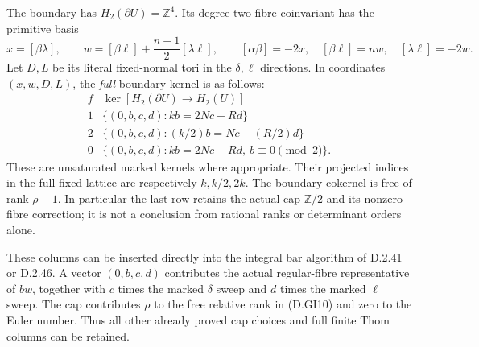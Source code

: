 The boundary has $H_2(\partial U)=\mathbb Z^4$. Its
degree-two fibre coinvariant has the primitive basis
\[
 x=[\beta\lambda],\qquad
 w=[\beta\ell]+\frac{n-1}{2}[\lambda\ell],\qquad
 [\alpha\beta]=-2x,\quad [\beta\ell]=nw,\quad
 [\lambda\ell]=-2w.                                     \tag{D.SL4}
\]
Let $D,L$ be its literal fixed-normal tori in the
$\delta,\ell$ directions. In coordinates $(x,w,D,L)$,
the \emph{full} boundary kernel is as follows:
\[
\begin{array}{c|c}
f&\ker[H_2(\partial U)\longrightarrow H_2(U)]\\\hline
1&\{(0,b,c,d):kb=2Nc-Rd\}\\
2&\{(0,b,c,d):(k/2)b=Nc-(R/2)d\}\\
0&\{(0,b,c,d):kb=2Nc-Rd,\ b\equiv0\pmod2\}.
\end{array}                                                \tag{D.SL5}
\]
These are unsaturated marked kernels where appropriate.
Their projected indices in the full fixed lattice are
respectively $k,k/2,2k$. The boundary cokernel is free of
rank $\rho-1$. In particular the last row retains the
actual cap $\mathbb Z/2$ and its nonzero fibre correction;
it is not a conclusion from rational ranks or determinant
orders alone.

These columns can be inserted directly into the integral
bar algorithm of D.2.41 or D.2.46. A vector $(0,b,c,d)$
contributes the actual regular-fibre representative of
$bw$, together with $c$ times the marked $\delta$ sweep
and $d$ times the marked $\ell$ sweep. The cap contributes
$\rho$ to the free relative rank in (D.GI10) and zero to
the Euler number. Thus all other already proved cap
choices and full finite Thom columns can be retained.

